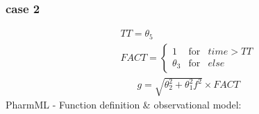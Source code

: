 \documentclass[a4paper,10pt]{article}
\begin{document}
\subsubsection{case 2}
\begin{eqnarray}
&&TT = \theta_5 \nonumber \\
&&FACT = \left\{ \begin{array}{rcl}  1 & \mbox{for}  & time > TT \\
\theta_3  & \mbox{for} & else  \nonumber
\end{array}\right.
\end{eqnarray}
\begin{eqnarray}
&&g = \sqrt{\theta_2^2 + \theta_1^2 f^2} \times FACT \nonumber
\end{eqnarray}
PharmML - Function definition \& observational model:
\end{document}
